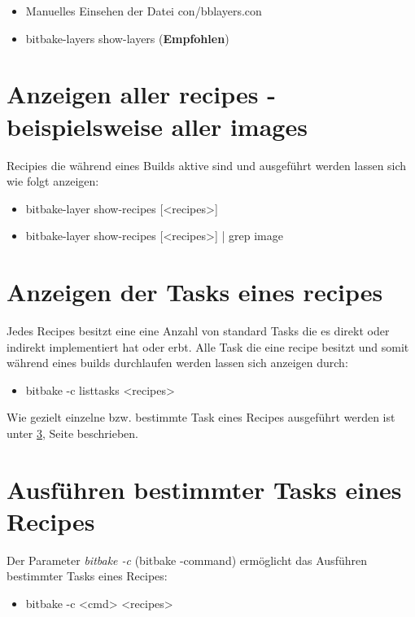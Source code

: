 \begin{itemize}
    \item Manuelles Einsehen der Datei con/bblayers.con
    \item bitbake-layers show-layers (\textbf{Empfohlen})
\end{itemize}


\section{Anzeigen aller recipes - beispielsweise aller images}%
\label{sec:anzeigen_aller_recipes}
Recipies die während eines Builds aktive sind und ausgeführt werden lassen sich
wie folgt anzeigen:

\begin{itemize}
    \item bitbake-layer show-recipes [<recipes>]
    \item bitbake-layer show-recipes [<recipes>] | grep image
\end{itemize}


\section{Anzeigen der Tasks eines recipes}%
\label{sec:anzeigen_der_tasks_eines_recipes}
Jedes Recipes besitzt eine eine Anzahl von standard Tasks die es direkt oder
indirekt implementiert hat oder erbt.
Alle Task die eine recipe besitzt und somit während eines builds
durchlaufen werden lassen sich anzeigen durch:

\begin{itemize}
    \item bitbake -c listtasks <recipes>
\end{itemize}

Wie gezielt einzelne bzw. bestimmte Task eines Recipes ausgeführt werden ist
unter \ref{sec:ausfuhren_bestimmter_tasks_eines_recipies}, Seite
\pageref{sec:ausfuhren_bestimmter_tasks_eines_recipies} beschrieben.

\section{Ausführen bestimmter Tasks eines Recipes}%
\label{sec:ausfuhren_bestimmter_tasks_eines_recipies}

Der Parameter \textit{bitbake -c} (bitbake -command) ermöglicht das Ausführen
bestimmter Tasks eines Recipes:

\begin{itemize}
    \item bitbake -c <cmd> <recipes>
\end{itemize}


